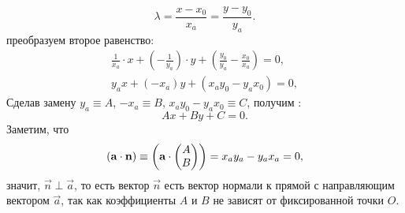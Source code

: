 \begin{equation*}
	\lambda = \frac{x - x_0}{x_a} = \frac{y - y_0}{y_a}.
\end{equation*}
преобразуем второе равенство:
\begin{gather*}
	\frac{1}{x_a} \cdot x + \left( - \frac{1}{y_a} \right) \cdot y + \left( \frac{y_0}{y_a} - \frac{x_0}{x_a} \right) = 0,\\
	y_a x + (-x_a)y + (x_a y_0 - y_a x_0) = 0,
\end{gather*}
Сделав замену $y_a \equiv A$, $-x_a \equiv B$, $x_a y_0 - y_a x_0 \equiv C$, получим :
\begin{equation}
	Ax + By + C = 0.
\end{equation}
Заметим, что
\begin{equation*}
	\left(\mathbf{a} \cdot \mathbf{n}\right) \equiv \left(\mathbf{a} \cdot \mathbf{
	\begin{pmatrix}
		A\\
		B
	\end{pmatrix}}\right) = x_a y_a - y_a x_a = 0,
\end{equation*}
значит, $\vec{n} \perp \vec{a}$, то есть вектор $\vec{n}$ есть вектор нормали к прямой с направляющим вектором $\vec{a}$, так как коэффициенты $A$ и $B$ не зависят от фиксированной точки $O$.
